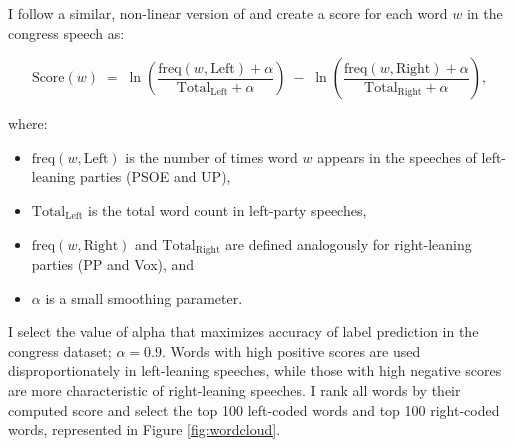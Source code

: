 \documentclass[12pt]{article}
\begin{document}
I follow a similar, non-linear version of \cite{laver2003extracting} and create a score for each word $w$ in the congress speech as: 



\begin{equation}
	\text{Score}(w) \;=\; \ln \left( \frac{\mathrm{freq}(w,\text{Left}) + \alpha}{\mathrm{Total}_{\text{Left}} + \alpha} \right) \;-\; \ln \left( \frac{\mathrm{freq}(w,\text{Right}) + \alpha}{\mathrm{Total}_{\text{Right}} + \alpha} \right),
	\label{eq:log_ratio}
\end{equation}

where:
\begin{itemize}
	\item $\mathrm{freq}(w,\text{Left})$ is the number of times word $w$ appears in the speeches of left-leaning parties (PSOE and UP),
	\item $\mathrm{Total}_{\text{Left}}$ is the total word count in left-party speeches,
	\item $\mathrm{freq}(w,\text{Right})$ and $\mathrm{Total}_{\text{Right}}$ are defined analogously for right-leaning parties (PP and Vox), and
	\item $\alpha$ is a small smoothing parameter.
	
\end{itemize}

I select the value of alpha that maximizes accuracy of label prediction in the congress dataset; $\alpha=0.9$.	
Words with high positive scores are used disproportionately in left-leaning speeches, while those with high negative scores are more characteristic of right-leaning speeches. I rank all words by their computed score and select the top 100 left-coded words and top 100 right-coded words, represented in  Figure  \ref{fig:wordcloud}. 
\end{document}
